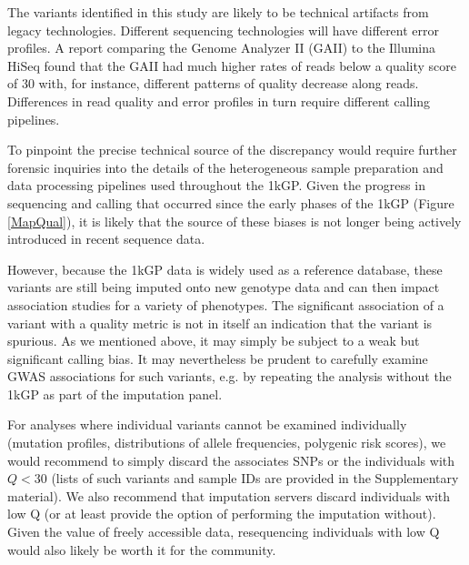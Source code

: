 \documentclass[9pt,lineno]{elife}
\begin{document}
The variants identified in this study are likely to be technical artifacts from legacy technologies.
Different sequencing technologies will have different error profiles. 
A report comparing the Genome Analyzer II (GAII) to the Illumina HiSeq found that the GAII had much higher rates of reads below a quality score of 30 \citep{Minoche2011} with, for instance, different patterns of quality decrease along reads. 
Differences in read quality and error profiles in turn require different calling pipelines.
 
To pinpoint the precise technical source of the discrepancy would require further forensic inquiries into the details of the heterogeneous sample preparation and data processing pipelines used throughout the 1kGP. Given the progress in sequencing and calling that occurred since the early phases of the 1kGP (Figure \ref{MapQual}), it is likely that the source of these biases is not longer being actively introduced in recent sequence data.

However, because the 1kGP data is widely used as a reference database, these variants are still being imputed onto new genotype data and can then impact association studies for a variety of phenotypes. The significant association of a variant with a quality metric is not in itself an indication that the variant is spurious. As we mentioned above, it may simply be subject to a weak but significant calling bias. It may nevertheless be prudent to carefully examine GWAS associations for such variants, e.g. by repeating the analysis without the 1kGP as part of the imputation panel. 

For analyses where individual variants cannot be examined individually (mutation profiles, distributions of allele frequencies, polygenic risk scores), we would recommend to simply discard the associates SNPs or the individuals with $Q<30$ (lists of such variants and sample IDs are provided in the Supplementary material). We also recommend that imputation servers discard individuals with low Q (or at least provide the option of performing the imputation without). Given the value of freely accessible data, resequencing individuals with low Q would  also likely be worth it for the community. 

\end{document}
